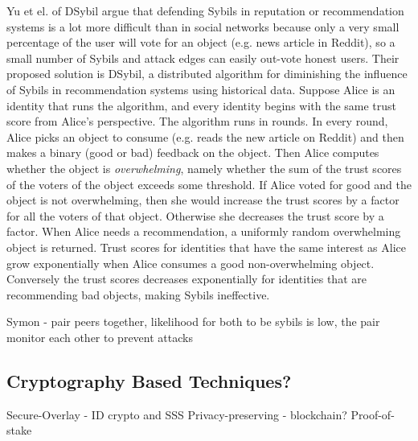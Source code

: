 Yu et el. of DSybil\cite{yu2009dsybil} argue that defending Sybils in reputation
or recommendation systems is a lot more difficult than in social networks
because only a very small percentage of the user will vote for an object (e.g.
news article in Reddit), so a small number of Sybils and attack edges can easily
out-vote honest users. Their proposed solution is DSybil, a distributed
algorithm for diminishing the influence of Sybils in recommendation systems
using historical data. Suppose Alice is an identity that runs the algorithm, and
every identity begins with the same trust score from Alice's perspective. The
algorithm runs in rounds. In every round, Alice picks an object to consume (e.g.
reads the new article on Reddit) and then makes a binary (good or bad) feedback
on the object. Then Alice computes whether the object is \emph{overwhelming},
namely whether the sum of the trust scores of the voters of the object exceeds
some threshold. If Alice voted for good and the object is not overwhelming, then
she would increase the trust scores by a factor for all the voters of that
object. Otherwise she decreases the trust score by a factor. When Alice needs a
recommendation, a uniformly random overwhelming object is returned. Trust scores
for identities that have the same interest as Alice grow exponentially when
Alice consumes a good non-overwhelming object. Conversely the trust scores
decreases exponentially for identities that are recommending bad objects, making
Sybils ineffective.

Symon\cite{jyothi2009symon} - pair peers together, likelihood for both to be sybils is low, the pair monitor each other to prevent attacks

\subsection{Cryptography Based Techniques?}
Secure-Overlay\cite{lua2007securing} - ID crypto and SSS
Privacy-preserving\cite{schaub2016trustless} - blockchain?
Proof-of-stake\cite{dennis2016rep}

